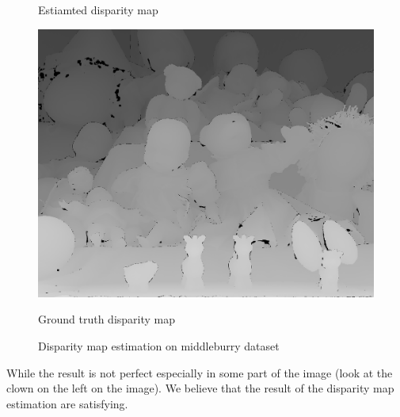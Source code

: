 \documentclass[10pt,twocolumn,letterpaper]{article}
\begin{document}
\begin{figure}
\begin{minipage}[t]{0.23\textwidth}
    \centerline{Estiamted disparity map}
    \end{minipage}
    \begin{minipage}[t]{0.23\textwidth}   
        \centerline{\includegraphics[width=\textwidth]{gt_midlb.png}}
        \centerline{Ground truth disparity map}
        \end{minipage}
    \caption{Disparity map estimation on middleburry dataset}
    \label{fig:midlb}
\end{figure}

While the result is not perfect especially in some part of the image (look at the clown on the left on the image). We believe that the result of the disparity map estimation are satisfying.
\end{document}
